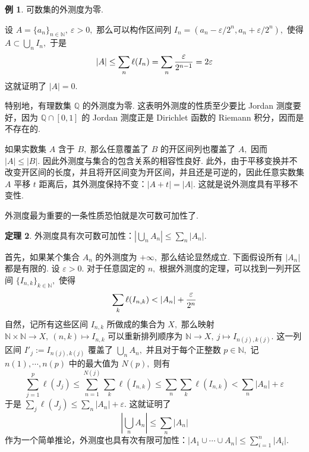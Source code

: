 \documentclass[12pt, a4paper, oneside]{book}
\numberwithin{figure}{section}
\theoremstyle{definition}
\newtheorem{theorem}{定理}[section]
\newtheorem{example}[theorem]{例}
\begin{document}
\begin{example}
    可数集的外测度为零.
\end{example}
设 $A=\{a_n\}_{n\in\mathbb N},\ \varepsilon>0,$ 那么可以构作区间列 $I_n=(a_n-\varepsilon/2^n,a_n+\varepsilon/2^n),$ 使得 $A\subset \bigcup_n I_n,$ 于是 
\begin{equation}
    |A|\leq \sum_n \ell(I_n)=\sum_n {\varepsilon\over 2^{n-1}}=2\varepsilon
\end{equation}
这就证明了 $|A|=0.$ 

特别地，有理数集 $\mathbb Q$ 的外测度为零. 这表明外测度的性质至少要比 Jordan 测度要好，因为 $\mathbb Q\cap [0,1]$ 的 Jordan 测度正是 Dirichlet 函数的 Riemann 积分，因而是不存在的.

如果实数集 $A$ 含于 $B,$ 那么任意覆盖了 $B$ 的开区间列也覆盖了 $A,$ 因而 $|A|\leq |B|.$ 因此外测度与集合的包含关系的相容性良好. 此外，由于平移变换并不改变开区间的长度，并且将开区间变为开区间，并且还是可逆的，因此任意实数集 $A$ 平移 $t$ 距离后，其外测度保持不变：$|A+t|=|A|.$ 这就是说外测度具有平移不变性.

外测度最为重要的一条性质恐怕就是次可数可加性了.
\begin{theorem}
    外测度具有次可数可加性：$|\bigcup_n A_n|\leq \sum_n |A_n|.$
\end{theorem}
首先，如果某个集合 $A_n$ 的外测度为 $+\infty,$ 那么结论显然成立. 下面假设所有 $|A_n|$ 都是有限的. 设 $\varepsilon>0.$ 对于任意固定的 $n,$ 根据外测度的定理，可以找到一列开区间 $\{I_{n,k}\}_{k\in\mathbb N},$ 使得
\begin{equation}
    \sum_k \ell(I_{n,k})<|A_n|+{\varepsilon\over 2^n}
\end{equation}
自然，记所有这些区间 $I_{n,k}$ 所做成的集合为 $X,$ 那么映射 $\mathbb N\times\mathbb N\to X,\ (n,k)\mapsto I_{n,k}$ 可以重新排列顺序为 $\mathbb N\to X,\ j\mapsto I_{n(j),k(j)}.$ 这一列区间 $I'_j:=I_{n(j),k(j)}$ 覆盖了 $\bigcup_n A_n,$ 并且对于每个正整数 $p\in\mathbb N,$ 记 $n(1),\cdots,n(p)$ 中的最大值为 $N(p),$ 则有
\begin{equation}
    \sum_{j=1}^p \ell(J_j) \leq \sum_{n=1}^{N(j)} \sum_k \ell(I_{n,k}) \leq \sum_n\sum_k \ell(I_{n,k})<\sum_n |A_n|+\varepsilon
\end{equation}
于是 $\sum_j \ell(J_j)\leq\sum_n |A_n|+\varepsilon.$ 
这就证明了 
\begin{equation}\label{eq:outer_measure_subadditivity}
    \left|\bigcup_n A_n\right|\leq \sum_n |A_n|
\end{equation}
作为一个简单推论，外测度也具有次有限可加性：$|A_1\cup\cdots\cup A_n|\leq \sum_{i=1}^n |A_i|.$ 
\end{document}
